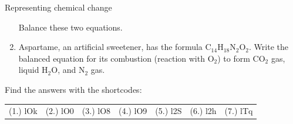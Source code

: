 \begin{eocexercises}{Representing chemical change}
\begin{enumerate}[noitemsep, label=\textbf{\arabic*}. ]
\begin{equation}
      \end{equation}
Balance these two equations.
\label{m38727*uid46}\item Aspartame, an artificial sweetener, has the formula ${\text{C}}_{14}{\text{H}}_{18}{\text{N}}_{2}{\text{O}}_{2}$. Write the balanced equation for its combustion (reaction with ${\text{O}}_{2}$) to form ${\text{CO}}_{2}$ gas, liquid $\text{H}_{2}\text{O}$, and ${\text{N}}_{2}$ gas.
\end{enumerate}
  \label{m38727**end}
  \label{337cc49099d6e82169c54b5d0fc3878f**end}
\par {} Find the answers with the shortcodes:
 \par \begin{tabular}[h]{cccccc}
 (1.) lOk  &  (2.) lO0  &  (3.) lO8  &  (4.) lO9  &  (5.) l2S  &  (6.) l2h  &  (7.) lTq  & \end{tabular}
\end{eocexercises}
